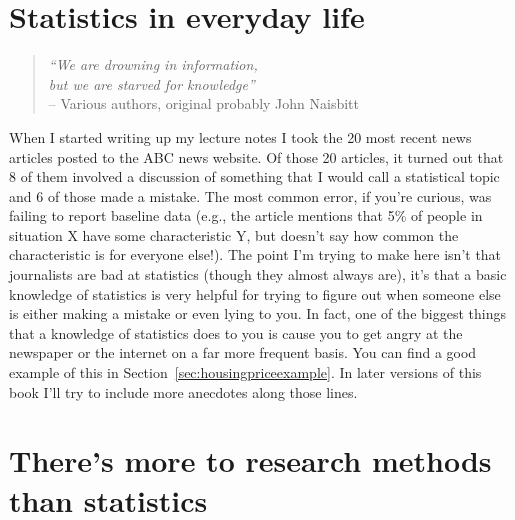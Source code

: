 \section{Statistics in everyday life}

\begin{quote}
{\it ``We are drowning in information,\\ but we are starved for knowledge''} \\ \hspace*{2cm} -- Various authors, original probably John Naisbitt
\end{quote}

\noindent
When I started writing up my lecture notes I took the 20 most recent news articles posted to the ABC news website. Of those 20 articles, it turned out that 8 of them involved a discussion of something that I would call a statistical topic and 6 of those made a mistake. The most common error, if you're curious, was failing to report baseline data (e.g., the article mentions that 5\% of people in situation X have some characteristic Y, but doesn't say how common the characteristic is for everyone else!). The point I'm trying to make here isn't that journalists are bad at statistics (though they almost always are), it's that a  basic knowledge of statistics is very helpful for trying to figure out when someone else is either making a mistake or even lying to you. In fact, one of the biggest things that a knowledge of statistics does to you is cause you to get angry at the newspaper or the internet on a far more frequent basis. You can find a good example of this in Section~\ref{sec:housingpriceexample}. In later versions of this book I'll try to include more anecdotes along those lines. 


\section{There's more to research methods than statistics}

